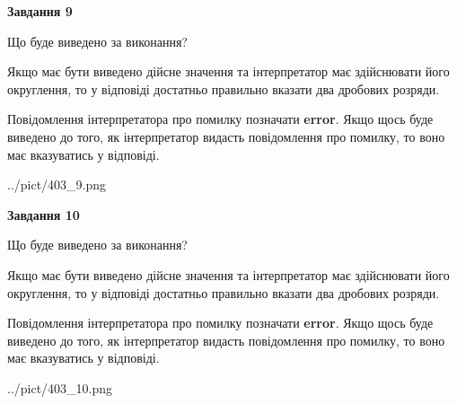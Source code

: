 \documentclass[12pt, ukrainian]{article}
\begin{document}
{\begin {Large}
{\begin {center}\textbf{Завдання 9}\end {center}}\par
Що буде виведено за виконання? \par

Якщо має бути виведено дійсне значення та інтерпретатор має здійснювати його округлення, 
то у відповіді достатньо правильно вказати два дробових розряди.

Повідомлення інтерпретатора про помилку позначати \textbf{error}.
Якщо щось буде виведено до того, як інтерпретатор видасть повідомлення про помилку, 
то воно має вказуватись у відповіді. \par

\begin{center}
	{../pict/403_9.png}
\end{center}
\newpage

{\begin {center}\textbf{Завдання 10}\end {center}}\par
Що буде виведено за виконання? \par

Якщо має бути виведено дійсне значення та інтерпретатор має здійснювати його округлення, 
то у відповіді достатньо правильно вказати два дробових розряди.

Повідомлення інтерпретатора про помилку позначати \textbf{error}.
Якщо щось буде виведено до того, як інтерпретатор видасть повідомлення про помилку, 
то воно має вказуватись у відповіді. \par

\begin{center}
	{../pict/403_10.png}
\end{center}
\newpage

\end {Large}}
\end{document}
